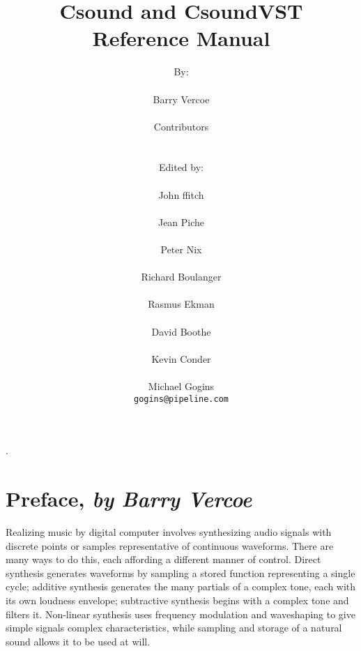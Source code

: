 \documentclass[10pt,letterpaper,onecolumn]{book}
\begin{document}
.
\setcounter{tocdepth}{1}

\frontmatter

\title{Csound and CsoundVST \\ Reference Manual}
\author{By: \\ \\Barry Vercoe \\ \\ Contributors \\ \\ \\ Edited by: \\ \\ John ffitch \\ \\ Jean Piche \\ \\ Peter Nix \\ \\ Richard Boulanger \\ \\ Rasmus Ekman \\ \\ David Boothe \\ \\ Kevin Conder \\ \\ Michael Gogins \\ \texttt{gogins@pipeline.com}}
\maketitle

\tableofcontents[2]
\listoffigures

\setcounter{secnumdepth}{-1}    
\chapter{Preface, \emph{by Barry Vercoe}}

Realizing music by digital computer involves synthesizing audio signals with discrete points or samples
representative of continuous waveforms. There are many ways to do this, each affording a different manner
of control. Direct synthesis generates waveforms by sampling a stored function representing a single cycle;
additive synthesis generates the many partials of a complex tone, each with its own loudness envelope;
subtractive synthesis begins with a complex tone and filters it. Non-linear synthesis uses frequency
modulation and waveshaping to give simple signals complex characteristics, while sampling and storage of a
natural sound allows it to be used at will.
\end{document}
